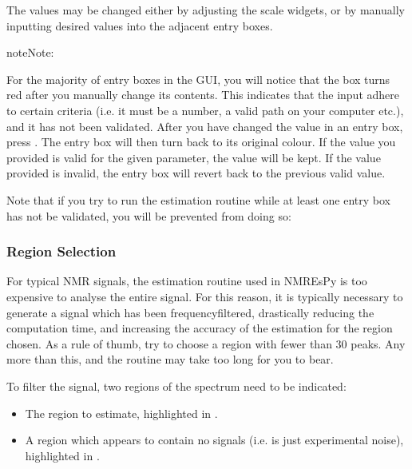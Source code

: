 \documentclass[letterpaper,10pt,english]{sphinxmanual}
\begin{document}
\sphinxAtStartPar
The values may be changed either by adjusting the scale widgets, or by manually
inputting desired values into the adjacent entry boxes.

\begin{sphinxadmonition}{note}{Note:}
\sphinxAtStartPar
{}

\sphinxAtStartPar
For the majority of entry boxes in the GUI, you will notice that the box
turns red after you manually change its contents. This indicates
that the input adhere to certain criteria (i.e. it must be a number, a
valid path on your computer etc.), and it has not been validated. After you
have changed the value in an entry box, press . The entry box
will then turn back to its original colour. If the value you
provided is valid for the given parameter, the value will be kept. If the
value provided is invalid, the entry box will revert back to the previous
valid value.

\sphinxAtStartPar
Note that if you try to run the estimation routine while at least one entry
box has not be validated, you will be prevented from doing so:

\end{sphinxadmonition}


\subsubsection{Region Selection}
\label{\detokenize{gui/usage/setup:region-selection}}
\sphinxAtStartPar
For typical NMR signals, the estimation routine used in NMR\sphinxhyphen{}EsPy is
too expensive to analyse the entire signal. For this reason, it is typically
necessary to generate a signal which has been frequency\sphinxhyphen{}filtered, drastically
reducing the computation time, and increasing the accuracy of the estimation
for the region chosen. As a rule of thumb, try to choose a region with fewer
than 30 peaks. Any more than this, and the routine may take too long for you
to bear.

\sphinxAtStartPar
To filter the signal, two regions of the spectrum need to be indicated:
\begin{itemize}
\item {} 
\sphinxAtStartPar
The region to estimate, highlighted in .

\item {} 
\sphinxAtStartPar
A region which appears to contain no signals
(i.e. is just experimental noise), highlighted in .

\end{itemize}
\end{document}
